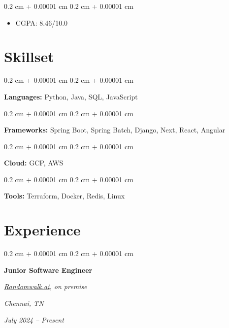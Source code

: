\documentclass[10pt, letterpaper]{article}
\newenvironment{highlights}{
    \begin{itemize}[
        topsep=0.10 cm,
        parsep=0.10 cm,
        partopsep=0pt,
        itemsep=0pt,
        leftmargin=0.4 cm + 10pt
    ]
}{
    \end{itemize}
} %
\newenvironment{onecolentry}{
    \begin{adjustwidth}{
        0.2 cm + 0.00001 cm
    }{
        0.2 cm + 0.00001 cm
    }
}{
    \end{adjustwidth}
} %
\newenvironment{twocolentry}[2][]{
    \onecolentry
    \def\secondColumn{#2}
    \setcolumnwidth{\fill, 4.5 cm}
    \begin{paracol}{2}
}{
    \switchcolumn \raggedleft \secondColumn
    \end{paracol}
    \endonecolentry
} %
\let\hrefWithoutArrow\href
\renewcommand{\href}[2]{\hrefWithoutArrow{#1}{\ifthenelse{\equal{#2}{}}{ }{#2 }\raisebox{.15ex}{\footnotesize \faExternalLink*}}}
\begin{document}
        \vspace{0.10 cm}
        \begin{onecolentry}
            \begin{highlights}
                \item CGPA: 8.46/10.0
            \end{highlights}
        \end{onecolentry}
        


    \section{Skillset}



        
        \begin{onecolentry}
            \textbf{Languages:} Python, Java, SQL, JavaScript
        \end{onecolentry}
        \vspace{0.10 cm}


        \begin{onecolentry}
            \textbf{Frameworks:} Spring Boot, Spring Batch, Django, Next, React, Angular
        \end{onecolentry}
        \vspace{0.10 cm}

        \begin{onecolentry}
            \textbf{Cloud:} GCP, AWS
        \end{onecolentry}
        \vspace{0.10 cm}

        \begin{onecolentry}
            \textbf{Tools:} Terraform, Docker, Redis, Linux
        \end{onecolentry}
        \vspace{0.10 cm}

    
    \section{Experience}



        
        \begin{twocolentry}{
        \textit{Chennai, TN}    
            
        \textit{July 2024 – Present}}
            \textbf{Junior Software Engineer}
            
            \textit{{\hrefWithoutArrow{https://randomwalk.ai/}{\color{black}\hspace*{0.13cm}Randomwalk.ai}}, on premise}
        \end{twocolentry}
\end{document}
